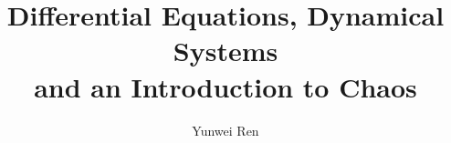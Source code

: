 

\title{
  Differential Equations, Dynamical Systems \\ 
  and an Introduction to Chaos
}
\author{Yunwei Ren}
\date{}


\maketitle
\tableofcontents

\newpage




